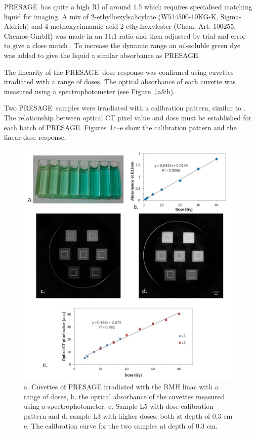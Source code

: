 		
	PRESAGE\textregistered \ has quite a high RI of around 1.5 which requires specialised matching liquid for imaging. 
	A  mix of  2-ethylhexylsalicylate (W514500-10KG-K, Sigma-Aldrich)
	and 4-methoxycinnamic acid 2-ethylhexylester (Chem.   Art.   100255, Chemos GmbH) %
	was made in an 11:1 ratio and then adjusted by trial and error to give a close match \cite{AbdulRahman:2011eqa}.
	To increase the dynamic range an oil-soluble green dye was added to give the liquid a similar absorbance as PRESAGE\textregistered.
		
	The linearity of the PRESAGE\textregistered \ dose response was confirmed using cuvettes irradiated with a range of doses. The optical absorbance of each cuvette was measured using a spectrophotometer (see Figure~\ref{fig:Presage_linearity}a\&b). 
		
	Two PRESAGE\textregistered \ samples were irradiated with a  calibration pattern, similar to \cite{doranestablishing2013}. The relationship between optical CT pixel value and dose must be established  for each batch of PRESAGE\textregistered. Figures~\ref{fig:Presage_linearity}c--e show the calibration pattern and the linear dose response.
	
	
	\begin{figure}
		\centering
		\includegraphics[width=\linewidth]{mrt_img/Presage_linearity}
		\caption{a. Cuvettes of PRESAGE irradiated with the RMH linac with a range of doses, b. the optical absorbance of the cuvettes measured using a spectrophotometer. c. Sample L5 with dose calibration pattern and d. sample L3 with higher doses, both at depth of 0.3 cm e. The calibration curve for the two samples at depth of 0.3 cm. }
		\label{fig:Presage_linearity}
	\end{figure}
	
